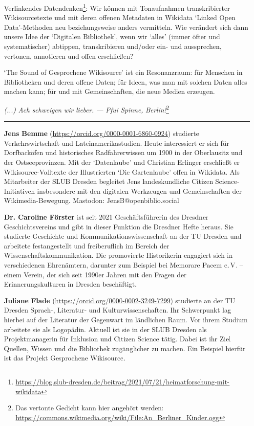 \documentclass[a4paper,
fontsize=11pt,
oneside,
numbers=noperiodatend,
parskip=half-,
bibliography=totoc,
final
]{scrartcl}
\begin{document}
Verlinkendes Datendenken\footnote{\url{https://blog.slub-dresden.de/beitrag/2021/07/21/heimatforschung-mit-wikidata}}:
Wir können mit Tonaufnahmen transkribierter Wikisourcetexte und mit
deren offenen Metadaten in Wikidata \enquote*{Linked Open Data}-Methoden
neu beziehungsweise anders vermitteln. Wie verändert sich dann unsere
Idee der \enquote*{Digitalen Bibliothek}, wenn wir \enquote*{alles}
(immer öfter und systematischer) abtippen, transkribieren und/oder ein-
und aussprechen, vertonen, annotieren und offen erschließen?

\enquote*{The Sound of Gesprochene Wikisource} ist ein Resonanzraum: für
Menschen in Bibliotheken und deren offene Daten; für Ideen, was man mit
solchen Daten alles machen kann; für und mit Gemeinschaften, die neue
Medien erzeugen.

\begin{center}
\emph{(...) Ach schweigen wir lieber. --- Pfui Spinne, Berlin!}\footnote{Das vertonte Gedicht kann hier angehört werden: \url{https://commons.wikimedia.org/wiki/File:An\_Berliner\_Kinder.ogg}}
\end{center}

\begin{center}\rule{0.5\linewidth}{0.5pt}\end{center}

\textbf{Jens Bemme} (\url{https://orcid.org/0000-0001-6860-0924}) studierte Verkehrswirtschaft und Lateinamerikastudien. Heute interessiert er sich für Dorfbacköfen und historisches Radfahrerwissen um 1900 in der Oberlausitz und der Ostseeprovinzen. Mit der \enquote*{Datenlaube} und Christian Erlinger erschließt er Wikisource-Volltexte der Illustrierten \enquote*{Die Gartenlaube} offen in Wikidata. Als Mitarbeiter der SLUB Dresden begleitet Jens landeskundliche Citizen Science-Initiativen insbesondere mit den digitalen Werkzeugen und Gemeinschaften der Wikimedia-Bewegung. Mastodon: JensB@openbiblio.social

\textbf{Dr. Caroline Förster} ist seit 2021 Geschäftsführerin des Dresdner Geschichtsvereins und gibt in dieser Funktion die Dresdner Hefte heraus. Sie studierte Geschichte und Kommunikationswissenschaft an der TU Dresden und arbeitete festangestellt und freiberuflich im Bereich der Wissenschaftskommunikation. Die promovierte Historikerin engagiert sich in verschiedenen Ehrenämtern, darunter zum Beispiel bei Memorare Pacem e.\,V. – einem Verein, der sich seit 1990er Jahren mit den Fragen der Erinnerungskulturen in Dresden beschäftigt.

\textbf{Juliane Flade} (\url{https://orcid.org/0000-0002-3249-7299}) studierte an der TU Dresden Sprach-, Literatur- und Kulturwissenschaften. Ihr Schwerpunkt lag hierbei auf der Literatur der Gegenwart im ländlichen Raum. Vor ihrem Studium arbeitete sie als Logopädin. Aktuell ist sie in der SLUB Dresden als Projektmanagerin für Inklusion und Citizen Science tätig. Dabei ist ihr Ziel Quellen, Wissen und die Bibliothek zugänglicher zu machen. Ein Beispiel hierfür ist das Projekt Gesprochene Wikisource.
\end{document}
